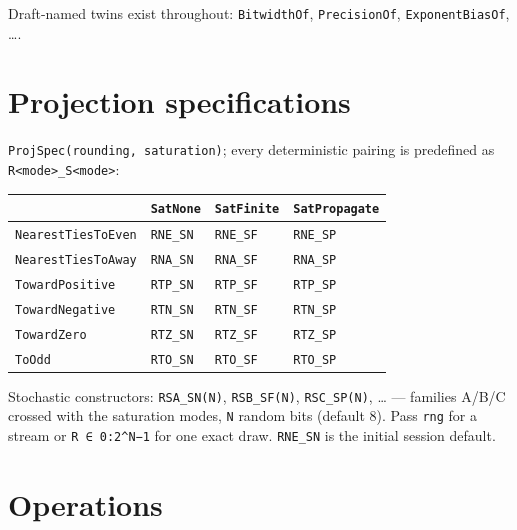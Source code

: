 Draft-named twins exist throughout: \texttt{BitwidthOf}, \texttt{PrecisionOf}, \texttt{ExponentBiasOf}, ….



\section{Projection specifications}



\label{714366806163910976}{}


\texttt{ProjSpec(rounding, saturation)}; every deterministic pairing is predefined as \texttt{R<mode>\_S<mode>}:




\begin{table}[h]
\centering
\begin{tabulary}{\linewidth}{L L L L}
\toprule
 & \texttt{SatNone} & \texttt{SatFinite} & \texttt{SatPropagate} \\
\toprule
\texttt{NearestTiesToEven} & \texttt{RNE\_SN} & \texttt{RNE\_SF} & \texttt{RNE\_SP} \\
\texttt{NearestTiesToAway} & \texttt{RNA\_SN} & \texttt{RNA\_SF} & \texttt{RNA\_SP} \\
\texttt{TowardPositive} & \texttt{RTP\_SN} & \texttt{RTP\_SF} & \texttt{RTP\_SP} \\
\texttt{TowardNegative} & \texttt{RTN\_SN} & \texttt{RTN\_SF} & \texttt{RTN\_SP} \\
\texttt{TowardZero} & \texttt{RTZ\_SN} & \texttt{RTZ\_SF} & \texttt{RTZ\_SP} \\
\texttt{ToOdd} & \texttt{RTO\_SN} & \texttt{RTO\_SF} & \texttt{RTO\_SP} \\
\bottomrule
\end{tabulary}

\end{table}



Stochastic constructors: \texttt{RSA\_SN(N)}, \texttt{RSB\_SF(N)}, \texttt{RSC\_SP(N)}, … — families A/B/C crossed with the saturation modes, \texttt{N} random bits (default 8). Pass \texttt{rng} for a stream or \texttt{R ∈ 0:2{\textasciicircum}N−1} for one exact draw. \texttt{RNE\_SN} is the initial session default.



\section{Operations}



